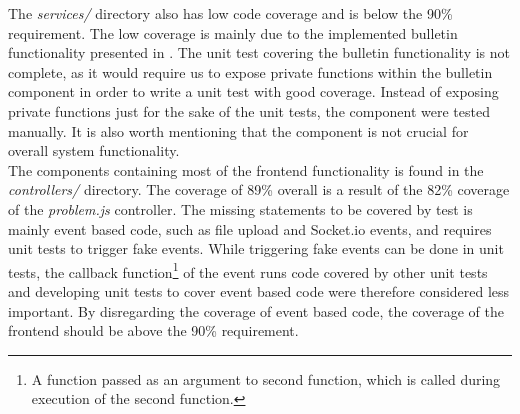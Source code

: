 The \textit{services/} directory also has low code coverage and is below the 90\% requirement. The low coverage is mainly due to the implemented bulletin functionality presented in . The unit test covering the bulletin functionality is not complete, as it would require us to expose private functions within the bulletin component in order to write a unit test with good coverage. Instead of exposing private functions just for the sake of the unit tests, the component were tested manually. It is also worth mentioning that the component is not crucial for overall system functionality. \\

The components containing most of the frontend functionality is found in the \textit{controllers/} directory. The coverage of 89\% overall is a result of the 82\% coverage of the \textit{problem.js} controller. The missing statements to be covered by test is mainly event based code, such as file upload and Socket.io events, and requires unit tests to trigger fake events. While triggering fake events can be done in unit tests, the callback function\footnote{A function passed as an argument to second function, which is called during execution of the second function.} of the event runs code covered by other unit tests and developing unit tests to cover event based code were therefore considered less important. By disregarding the coverage of event based code, the coverage of the frontend should be above the 90\% requirement.

